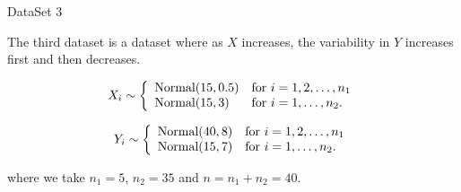 \documentclass[12]{report}
\begin{document}
        
        


\Large{DataSet 3}\\[0.1cm]

\normalsize

The third dataset is a dataset where as $X$ increases, the variability in $Y$ increases first and then decreases.

\[ X_i \sim \left\{ \begin{array}{ll}
         \hbox{Normal} (15, 0.5) & \mbox{for $i = 1,2, \dots, n_1$}\\
        \hbox{Normal} (15, 3) & \mbox{for $i = 1,  \dots, n_2$}.\end{array} \right. \]

\[ Y_i \sim \left\{ \begin{array}{ll}
         \hbox{Normal} (40 , 8) & \mbox{for $i = 1,2, \dots, n_1$}\\
        \hbox{Normal}  (15 , 7) & \mbox{for $i = 1, \dots, n_2$}.\end{array} \right. \]
        
 where we take $n_1 = 5$, $n_2 = 35$ and $n = n_1 + n_2 = 40$. \\       
 
\end{document}

